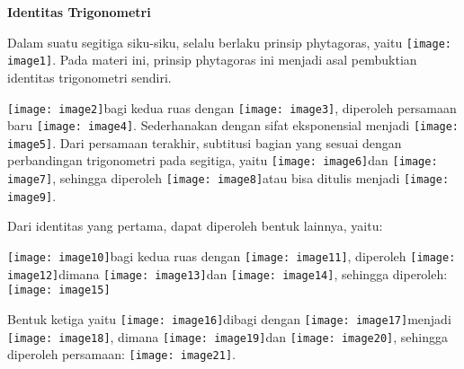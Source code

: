 \documentclass[11pt,fleqn]{book} %
\begin{document}
\noindent \textbf{Identitas Trigonometri}

Dalam suatu segitiga siku-siku, selalu berlaku prinsip phytagoras, yaitu \texttt{[image: image1]}. Pada materi ini, prinsip phytagoras ini menjadi asal pembuktian identitas trigonometri sendiri.

\noindent \texttt{[image: image2]}bagi kedua ruas dengan \texttt{[image: image3]}, diperoleh persamaan baru \texttt{[image: image4]}. Sederhanakan dengan sifat eksponensial menjadi \texttt{[image: image5]}. Dari persamaan terakhir, subtitusi bagian yang sesuai dengan perbandingan trigonometri pada segitiga, yaitu \texttt{[image: image6]}dan \texttt{[image: image7]}, sehingga diperoleh \texttt{[image: image8]}atau bisa ditulis menjadi \texttt{[image: image9]}.

\noindent Dari identitas yang pertama, dapat diperoleh bentuk lainnya, yaitu:

\noindent \texttt{[image: image10]}bagi kedua ruas dengan \texttt{[image: image11]}, diperoleh \texttt{[image: image12]}dimana \texttt{[image: image13]}dan \texttt{[image: image14]}, sehingga diperoleh: \texttt{[image: image15]}

\noindent Bentuk ketiga yaitu \texttt{[image: image16]}dibagi dengan \texttt{[image: image17]}menjadi \texttt{[image: image18]}, dimana \texttt{[image: image19]}dan \texttt{[image: image20]}, sehingga diperoleh persamaan: \texttt{[image: image21]}.
\end{document}

